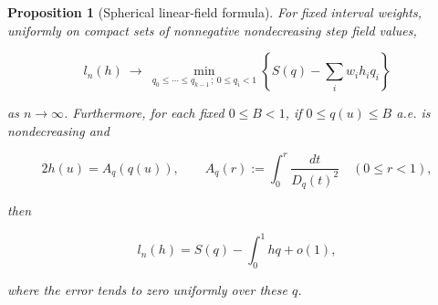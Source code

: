 \documentclass[11pt]{article}
\newtheorem{proposition}[theorem]{Proposition}
\begin{document}
\begin{proposition}[Spherical linear-field formula]\label{prop:spherical}
For fixed interval weights, uniformly on compact sets of nonnegative
nondecreasing step field values,

\begin{equation}\label{eq:spherical-dual}
l_n(h)\ \longrightarrow\ \min_{q_0\le\cdots\le q_{k-1}\,;\ 0\le q_i<1}
       \left\{S(q)-\sum_i w_i h_i q_i\right\}
\end{equation}

as $n\to\infty$. Furthermore, for each fixed $0\le B<1$, if $0\le q(u)\le B$ a.e. is nondecreasing and

\begin{equation}\label{eq:stationary-field}
2h(u)=A_q(q(u)),\qquad A_q(r):=\int_0^r\frac{dt}{D_q(t)^2}\quad(0\le r<1),
\end{equation}

then

\begin{equation}\label{eq:spherical-uniform}
l_n(h)=S(q)-\int_0^1 hq+o(1),
\end{equation}

where the error tends to zero uniformly over these $q$.
\end{proposition}
\end{document}

